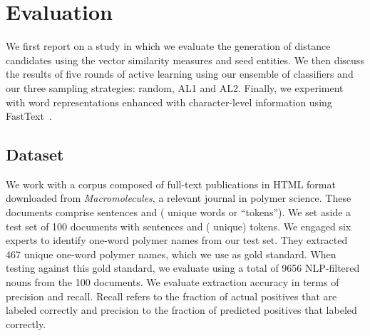 \section{Evaluation}
\label{sect:results}
We first report on a study in which we evaluate the generation of distance candidates using the vector similarity measures and seed entities. 
We then discuss the results of five rounds of active learning using our ensemble of classifiers and our three sampling strategies: random, AL1 and AL2.
Finally, we experiment with word representations enhanced with character-level information using FastText~\cite{bojanowski2016enriching,joulin2016bag}.

\subsection{Dataset}
We work with a corpus composed of  full-text publications in HTML format downloaded from \textit{Macromolecules}, a relevant journal in polymer science.
These documents comprise  sentences and  ( unique words or ``tokens'').
We set aside a test set of  100 documents with   sentences and  ( unique) tokens. 
We engaged six experts to identify one-word polymer names from our test set.
They extracted 467 unique one-word polymer names, which we use as gold standard.
When testing against this gold standard, we evaluate using a total of 9656 NLP-filtered nouns from the 100 documents.
We evaluate extraction accuracy in terms of precision and recall.
Recall refers to the fraction of actual positives that
are labeled correctly and precision to the fraction of predicted
positives that labeled correctly.

